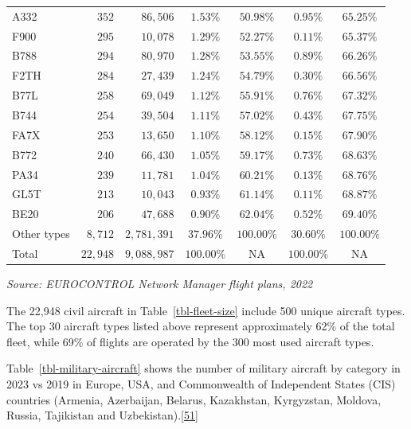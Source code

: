 \documentclass[
  11pt,
  a4paper,
]{book}
\begin{document}
\begin{longtable}{lrrcccc}
A332 & $352$ & $86,506$ & $1.53\%$ & $50.98\%$ & $0.95\%$ & $65.25\%$ \\ 
F900 & $295$ & $10,078$ & $1.29\%$ & $52.27\%$ & $0.11\%$ & $65.37\%$ \\ 
B788 & $294$ & $80,970$ & $1.28\%$ & $53.55\%$ & $0.89\%$ & $66.26\%$ \\ 
F2TH & $284$ & $27,439$ & $1.24\%$ & $54.79\%$ & $0.30\%$ & $66.56\%$ \\ 
B77L & $258$ & $69,049$ & $1.12\%$ & $55.91\%$ & $0.76\%$ & $67.32\%$ \\ 
B744 & $254$ & $39,504$ & $1.11\%$ & $57.02\%$ & $0.43\%$ & $67.75\%$ \\ 
FA7X & $253$ & $13,650$ & $1.10\%$ & $58.12\%$ & $0.15\%$ & $67.90\%$ \\ 
B772 & $240$ & $66,430$ & $1.05\%$ & $59.17\%$ & $0.73\%$ & $68.63\%$ \\ 
PA34 & $239$ & $11,781$ & $1.04\%$ & $60.21\%$ & $0.13\%$ & $68.76\%$ \\ 
GL5T & $213$ & $10,043$ & $0.93\%$ & $61.14\%$ & $0.11\%$ & $68.87\%$ \\ 
BE20 & $206$ & $47,688$ & $0.90\%$ & $62.04\%$ & $0.52\%$ & $69.40\%$ \\ 
Other types & $8,712$ & $2,781,391$ & $37.96\%$ & $100.00\%$ & $30.60\%$ & $100.00\%$ \\ 
Total & $22,948$ & $9,088,987$ & $100.00\%$ & NA & $100.00\%$ & NA \\ 
\bottomrule
\end{longtable}
\begin{minipage}{\linewidth}
\emph{Source: EUROCONTROL Network Manager flight plans, 2022}\\
\end{minipage}

The 22,948 civil aircraft in Table~\ref{tbl-fleet-size} include 500
unique aircraft types. The top 30 aircraft types listed above represent
approximately 62\% of the total fleet, while 69\% of flights are
operated by the 300 most used aircraft types.

Table~\ref{tbl-military-aircraft} shows the number of military aircraft
by category in 2023 vs 2019 in Europe, USA, and Commonwealth of
Independent States (CIS) countries (Armenia, Azerbaijan, Belarus,
Kazakhstan, Kyrgyzstan, Moldova, Russia, Tajikistan and
Uzbekistan).\protect\hyperlink{ref-flightglobal2023}{{[}51{]}}
\end{document}
